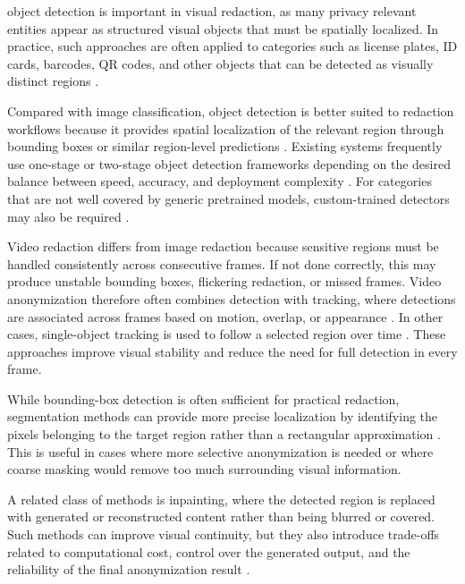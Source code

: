 
\Gls{object detection} is important in visual redaction, as many privacy relevant entities appear as structured visual objects that must be spatially localized. In practice, such approaches are often applied to categories such as license plates, ID cards, barcodes, QR codes, and other objects that can be detected as visually distinct regions \cite{ge2021yolox}.

Compared with image classification, \gls{object detection} is better suited to redaction workflows because it provides spatial localization of the relevant region through \gls{bounding box}es or similar region-level predictions \cite{ren2015faster, sun2024evolution}. Existing systems frequently use one-stage or two-stage \gls{object detection} frameworks depending on the desired balance between speed, accuracy, and deployment complexity \cite{ren2015faster, ge2021yolox, sun2024evolution}. For categories that are not well covered by generic pretrained models, custom-trained detectors may also be required \cite{ge2021yolox, yolox_custom_train}.


Video redaction differs from image redaction because sensitive regions must be handled consistently across consecutive frames. If not done correctly, this may produce unstable \gls{bounding box}es, flickering redaction, or missed frames. Video \gls{anonymization} therefore often combines detection with tracking, where detections are associated across frames based on motion, overlap, or appearance \cite{bewley2016sort, wojke2017deepsort}. In other cases, single-object tracking is used to follow a selected region over time \cite{opencv_vittrack, lukezic2017csrt}. These approaches improve visual stability and reduce the need for full detection in every frame.



While bounding-box detection is often sufficient for practical redaction, \gls{segmentation} methods can provide more precise localization by identifying the pixels belonging to the target region rather than a rectangular approximation \cite{he2017mask, kirillov2023segment}. This is useful in cases where more selective \gls{anonymization} is needed or where coarse \gls{masking} would remove too much surrounding visual information.

A related class of methods is \gls{inpainting}, where the detected region is replaced with generated or reconstructed content rather than being blurred or covered. Such methods can improve visual continuity, but they also introduce trade-offs related to computational cost, control over the generated output, and the reliability of the final \gls{anonymization} result \cite{piano2024ldm, rad2024}.

